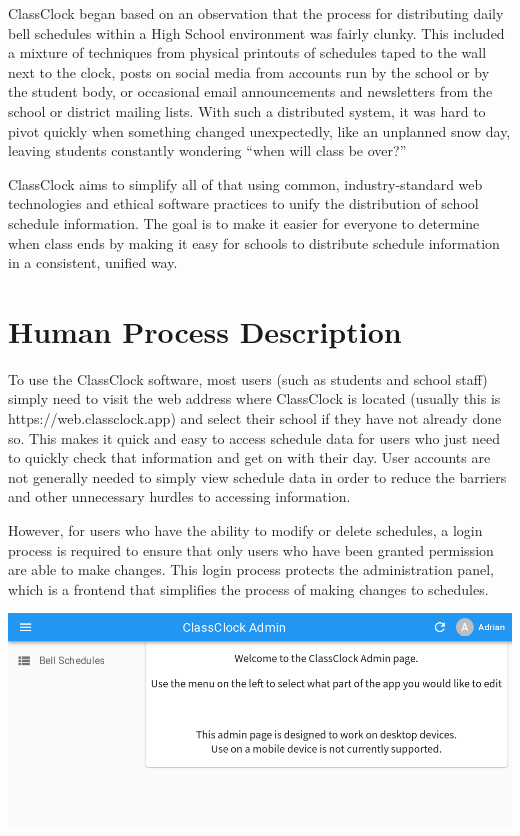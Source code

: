 \documentclass{article}
\begin{document}
{ClassClock began based on an observation that the process for distributing daily bell schedules within a High School
environment was fairly clunky. This included a mixture of techniques from physical printouts of schedules taped to the
wall next to the clock, posts on social media from accounts run by the school or by the student body, or occasional
email announcements and newsletters from the school or district mailing lists. With such a distributed system, it was
hard to pivot quickly when something changed unexpectedly, like an unplanned snow day, leaving students constantly
wondering “when will class be over?”}


{ClassClock aims to simplify all of that using common, industry-standard web technologies and ethical software practices
to unify the distribution of school schedule information. The goal is to make it easier for everyone to determine when
class ends by making it easy for schools to distribute schedule information in a consistent, unified way.}

\section{Human Process Description}
{To use the ClassClock software, most users (such as students and school staff) simply need to visit the web address
where ClassClock is located (usually this is https://web.classclock.app) and select their school if they have not
already done so. This makes it quick and easy to access schedule data for users who just need to quickly check that
information and get on with their day. User accounts are not generally needed to simply view schedule data in order to
reduce the barriers and other unnecessary hurdles to accessing information.}

{However, for users who have the ability to modify or delete schedules, a login process is required to ensure that only
users who have been granted permission are able to make changes. This login process protects the administration panel,
which is a frontend that simplifies the process of making changes to schedules.}



\begin{center}
\includegraphics[width=\textwidth]{Mini20Manual-img004.png}
\end{center}
\end{document}
